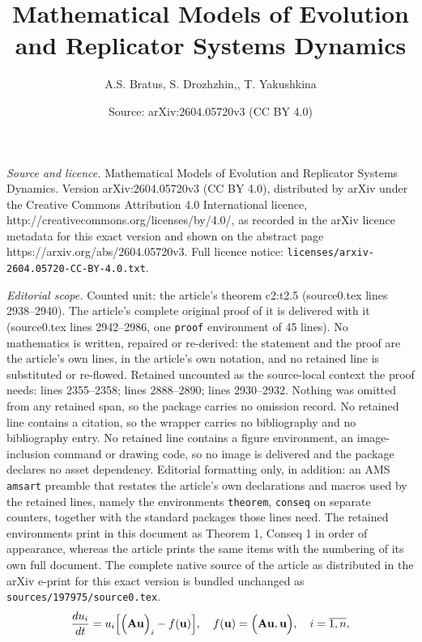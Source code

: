 \documentclass[10pt,a4paper]{amsart}
\title{Mathematical Models of Evolution and Replicator Systems Dynamics}
\author{A.S. Bratus, S. Drozhzhin,, T. Yakushkina}
\date{Source: arXiv:2604.05720v3 (CC BY 4.0)}
\begin{document}
\maketitle

\noindent\emph{Source and licence.} Mathematical Models of Evolution and Replicator Systems Dynamics. Version arXiv:2604.05720v3 (CC BY 4.0), distributed by arXiv under the Creative Commons Attribution 4.0 International licence, http://creativecommons.org/licenses/by/4.0/, as recorded in the arXiv licence metadata for this exact version and shown on the abstract page https://arxiv.org/abs/2604.05720v3. Full licence notice: \texttt{licenses/arxiv-2604.05720-CC-BY-4.0.txt}.\par\smallskip

\noindent\textit{Editorial scope.} Counted unit: the article's theorem c2:t2.5 (source0.tex lines 2938--2940). The article's complete original proof of it is delivered with it (source0.tex lines 2942--2986, one \texttt{proof} environment of 45 lines). No mathematics is written, repaired or re-derived: the statement and the proof are the article's own lines, in the article's own notation, and no retained line is substituted or re-flowed.  Retained uncounted as the source-local context the proof needs: lines 2355--2358; lines 2888--2890; lines 2930--2932.  Nothing was omitted from any retained span, so the package carries no omission record.  No retained line contains a citation, so the wrapper carries no bibliography and no bibliography entry.  No retained line contains a figure environment, an image-inclusion command or drawing code, so no image is delivered and the package declares no asset dependency.  Editorial formatting only, in addition: an AMS \texttt{amsart} preamble that restates the article's own declarations and macros used by the retained lines, namely the environments \texttt{theorem}, \texttt{conseq} on separate counters, together with the standard packages those lines need.  The retained environments print in this document as Theorem 1, Conseq 1 in order of appearance, whereas the article prints the same items with the numbering of its own full document.  The complete native source of the article as distributed in the arXiv e-print for this exact version is bundled unchanged as \texttt{sources/197975/source0.tex}.
\begin{equation}\label{c2:eq1.5}
    \frac{du_{i}}{dt} = u_{i}\Big[\Big({\bf Au}\Big)_{i} - f({\bf u})\Big],
    \quad f({\bf u}) = \Big({\bf Au, u}\Big), \quad i = \overline{1,n},
\end{equation}
\end{document}
